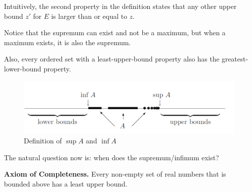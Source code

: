 \documentclass[12pt,a4paper]{article}
\theoremstyle{definition}
\newtheorem{theorem}{Theorem}[section]
\newtheorem{definition}{Definition}[section]
\begin{document}
Intuitively, the second property in the definition states that any other upper bound $z'$ for $E$ is larger than or equal to $z$.

Notice that the supremum can exist and not be a maximum, but when a maximum exists, it is also the supremum.

Also, every ordered set with a least-upper-bound property also has the greatest-lower-bound property.

\begin{figure}[h]
  \centering
  \includegraphics[width=\textwidth]{sup-inf}
  \caption{Definition of $\sup A$ and $\inf A$ \cite{abbott2001understanding}}
  \label{fig:sup-inf}
\end{figure}

%
%

The natural question now is: when does the supremum/infimum exist?

\textbf{Axiom of Completeness.} Every non-empty set of real numbers that is bounded above has a least upper bound.


%
\end{document}
